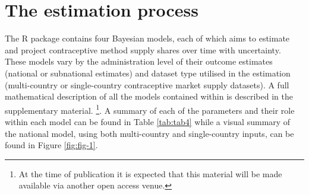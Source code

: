 \begin{table}[h]
\caption{The arguments of the get\_modelinputs function. The purpose of this function is to get the model inputs for the JAGS model used for supply share estimation. In the table, the argument name and data type of the argument is stated, a description of the argument and any default values is then provided.}
\label{tab:tab2}
\end{table}

\section{The estimation process}\label{the-estimation-process}

The  R package contains four Bayesian models, each of which aims to estimate and project contraceptive method supply shares over time with uncertainty. These models vary by the administration level of their outcome estimates (national or subnational estimates) and dataset type utilised in the estimation (multi-country or single-country contraceptive market supply datasets). A full mathematical description of all the models contained within  is described in the supplementary material. \footnote{At the time of publication it is expected that this material will be made available via another open access venue.}. A summary of each of the parameters and their role within each model can be found in Table \ref{tab:tab4} while a visual summary of the national model, using both multi-country and single-country inputs, can be found in Figure \ref{fig:fig-1}.

